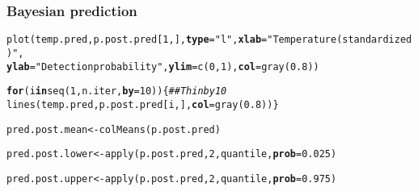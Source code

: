 \documentclass[color=usenames,dvipsnames]{beamer}\usepackage[]{graphicx}\usepackage[]{color}
\makeatletter
\newcommand{\hlnum}[1]{\textcolor[rgb]{0.69,0.494,0}{#1}}%
\newcommand{\hlstr}[1]{\textcolor[rgb]{0.749,0.012,0.012}{#1}}%
\newcommand{\hlcom}[1]{\textcolor[rgb]{0.514,0.506,0.514}{\textit{#1}}}%
\newcommand{\hlstd}[1]{\textcolor[rgb]{0,0,0}{#1}}%
\newcommand{\hlkwa}[1]{\textcolor[rgb]{0,0,0}{\textbf{#1}}}%
\newcommand{\hlkwb}[1]{\textcolor[rgb]{0,0.341,0.682}{#1}}%
\newcommand{\hlkwc}[1]{\textcolor[rgb]{0,0,0}{\textbf{#1}}}%
\newcommand{\hlkwd}[1]{\textcolor[rgb]{0.004,0.004,0.506}{#1}}%
\newenvironment{kframe}{%
 \def\at@end@of@kframe{}%
 \ifinner\ifhmode%
  \def\at@end@of@kframe{\end{minipage}}%
  \begin{minipage}{\columnwidth}%
 \fi\fi%
 \def\FrameCommand##1{\hskip\@totalleftmargin \hskip-\fboxsep
 \colorbox{shadecolor}{##1}\hskip-\fboxsep
     \hskip-\linewidth \hskip-\@totalleftmargin \hskip\columnwidth}%
 \MakeFramed {\advance\hsize-\width
   \@totalleftmargin\z@ \linewidth\hsize
   \@setminipage}}%
 {\par\unskip\endMakeFramed%
 \at@end@of@kframe}
\newenvironment{knitrout}{}{} %
\makeatother
\begin{document}
\begin{frame}[fragile]
  \frametitle{Bayesian prediction}
\begin{knitrout}\tiny
{}\color{fgcolor}\begin{kframe}
\begin{alltt}
\hlkwd{plot}\hlstd{(temp.pred, p.post.pred[}\hlnum{1}\hlstd{,],} \hlkwc{type}\hlstd{=}\hlstr{"l"}\hlstd{,} \hlkwc{xlab}\hlstd{=}\hlstr{"Temperature (standardized)"}\hlstd{,}
     \hlkwc{ylab}\hlstd{=}\hlstr{"Detection probability"}\hlstd{,} \hlkwc{ylim}\hlstd{=}\hlkwd{c}\hlstd{(}\hlnum{0}\hlstd{,} \hlnum{1}\hlstd{),} \hlkwc{col}\hlstd{=}\hlkwd{gray}\hlstd{(}\hlnum{0.8}\hlstd{))}
\end{alltt}


{\ttfamily\noindent\bfseries\color{errorcolor}{\#\# Error in h(simpleError(msg, call)): error in evaluating the argument 'y' in selecting a method for function 'plot': object 'p.post.pred' not found}}\begin{alltt}
\hlkwa{for}\hlstd{(i} \hlkwa{in} \hlkwd{seq}\hlstd{(}\hlnum{1}\hlstd{, n.iter,} \hlkwc{by}\hlstd{=}\hlnum{10}\hlstd{)) \{}  \hlcom{## Thin by 10}
    \hlkwd{lines}\hlstd{(temp.pred, p.post.pred[i,],} \hlkwc{col}\hlstd{=}\hlkwd{gray}\hlstd{(}\hlnum{0.8}\hlstd{))  \}}
\end{alltt}


{\ttfamily\noindent\bfseries\color{errorcolor}{\#\# Error in seq(1, n.iter, by = 10): object 'n.iter' not found}}\begin{alltt}
\hlstd{pred.post.mean} \hlkwb{<-} \hlkwd{colMeans}\hlstd{(p.post.pred)}
\end{alltt}


{\ttfamily\noindent\bfseries\color{errorcolor}{\#\# Error in is.data.frame(x): object 'p.post.pred' not found}}\begin{alltt}
\hlstd{pred.post.lower} \hlkwb{<-} \hlkwd{apply}\hlstd{(p.post.pred,} \hlnum{2}\hlstd{, quantile,} \hlkwc{prob}\hlstd{=}\hlnum{0.025}\hlstd{)}
\end{alltt}


{\ttfamily\noindent\bfseries\color{errorcolor}{\#\# Error in apply(p.post.pred, 2, quantile, prob = 0.025): object 'p.post.pred' not found}}\begin{alltt}
\hlstd{pred.post.upper} \hlkwb{<-} \hlkwd{apply}\hlstd{(p.post.pred,} \hlnum{2}\hlstd{, quantile,} \hlkwc{prob}\hlstd{=}\hlnum{0.975}\hlstd{)}
\end{alltt}



\end{kframe}
\end{knitrout}
\end{frame}
\end{document}
